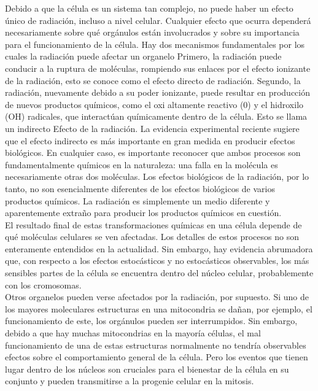 \documentclass[]{article}
\begin{document}
Debido a que la célula es un sistema tan complejo, no puede haber un efecto único de radiación,
incluso a nivel celular. Cualquier efecto que ocurra dependerá necesariamente sobre qué orgánulos están involucrados y sobre su importancia para el funcionamiento de la célula. Hay dos mecanismos fundamentales por los cuales la radiación puede afectar un organelo Primero, la radiación puede conducir a la ruptura de moléculas, rompiendo sus enlaces por el efecto ionizante de la radiación, esto se conoce como el efecto directo de radiación. Segundo, la radiación, nuevamente debido a su poder ionizante, puede resultar en producción de nuevos productos químicos, como el oxi altamente reactivo (0) y el hidroxilo (OH) radicales, que interactúan químicamente dentro de la célula. Esto se llama un indirecto Efecto de la radiación. La evidencia experimental reciente sugiere que el efecto indirecto es más importante en gran medida en producir efectos biológicos. En cualquier caso, es importante reconocer que ambos procesos son fundamentalmente químicos en la naturaleza: una falla en la molécula es necesariamente otras dos moléculas. Los efectos biológicos de la radiación, por lo tanto, no son esencialmente diferentes de los efectos biológicos de varios productos químicos. La radiación es simplemente un medio diferente y aparentemente extraño para producir los productos químicos en cuestión.\\

El resultado final de estas transformaciones químicas en una célula depende de qué moléculas celulares se ven afectadas. Los detalles de estos procesos no son enteramente entendidos en la actualidad. Sin embargo, hay evidencia abrumadora que, con respecto a los efectos estocásticos y no estocásticos observables, los más sensibles partes de la célula se encuentra dentro del núcleo celular, probablemente con los cromosomas.\\

Otros organelos pueden verse afectados por la radiación, por supuesto. Si uno de los mayores moleculares estructuras en una mitocondria se dañan, por ejemplo, el funcionamiento de este, los orgánulos pueden ser interrumpidos. Sin embargo, debido a que hay muchas mitocondrias en la mayoría células, el mal funcionamiento de una de estas estructuras normalmente no tendría observables efectos sobre el comportamiento general de la célula. Pero los eventos que tienen lugar dentro de los núcleos son cruciales para el bienestar de la célula en su conjunto y pueden transmitirse a la progenie celular en la mitosis.\\
\end{document}
